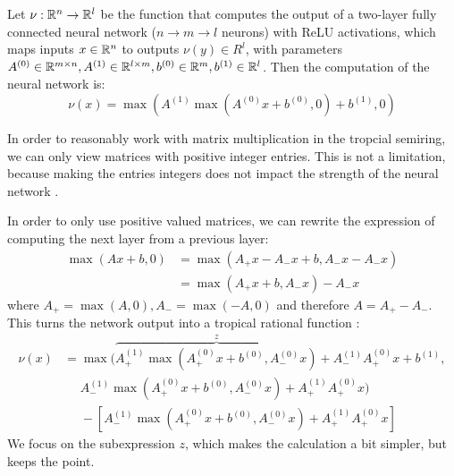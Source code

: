 Let $\nu: \mathbb{R}^n \rightarrow \mathbb{R}^l$ be the function that computes the output of a two-layer fully connected neural network ($n \rightarrow m \rightarrow l$ neurons) with ReLU activations,
which maps inputs $x \in \mathbb{R}^n$ to outputs $\nu(y) \in R^l$, with parameters $A^{(0)} \in \mathbb{R}^{m \times n}, A^{(1)} \in \mathbb{R}^{l \times m}, b^{(0)} \in \mathbb{R}^m, b^{(1)} \in \mathbb{R}^l$.
Then the computation of the neural network is:
$$\nu(x) = \max(A^{(1)}\max(A^{(0)}x + b^{(0)}, 0) + b^{(1)}, 0)$$

In order to reasonably work with matrix multiplication in the tropcial semiring, we can only view matrices with positive integer entries.
This is not a limitation, because making the entries integers does not impact the strength of the neural network \citep[see][sec.~4]{Zhang2018}.

In order to only use positive valued matrices, we can rewrite the expression of computing the next layer from a previous layer:
\begin{align*}
    \max(Ax + b, 0) & = \max(A_+ x - A_- x + b, A_- x - A_- x) \\
                    & = \max(A_+ x + b, A_- x) - A_- x
\end{align*}
where $A_+ = \max(A, 0), A_- = \max(-A, 0)$ and therefore $A = A_+ - A_-$.
This turns the network output into a tropical rational function \citep[see][sec.~5]{Zhang2018}:
\begin{align*}
    \nu(x) & = \max(\overbrace{A^{(1)}_+ \max(A^{(0)}_+ x + b^{(0)}, A^{(0)}_- x)}^z + A^{(1)}_- A^{(0)}_+ x + b^{(1)}, \\
           & \phantom{{} =} A^{(1)}_- \max(A^{(0)}_+ x + b^{(0)}, A^{(0)}_- x) + A^{(1)}_+ A^{(0)}_+ x)                 \\
           & \phantom{{} =} -\left[A^{(1)}_- \max(A^{(0)}_+ x + b^{(0)}, A^{(0)}_- x) + A^{(1)}_+ A^{(0)}_+ x\right]
\end{align*}
We focus on the subexpression $z$, which makes the calculation a bit simpler, but keeps the point.

